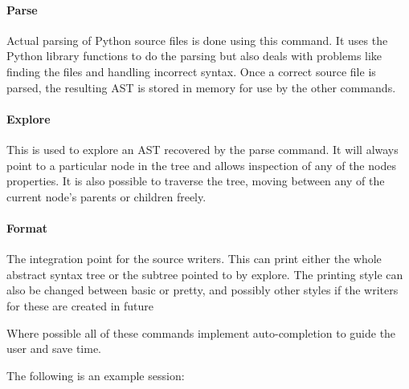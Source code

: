\documentclass{report}
\begin{document}
\paragraph{Parse}

Actual parsing of Python source files is done using this command. It uses the Python library functions to do the parsing but also
deals with problems like finding the files and handling incorrect syntax. Once a correct source file is parsed, the resulting AST
is stored in memory for use by the other commands.

\paragraph{Explore}

This is used to explore an AST recovered by the parse command. It will always point to a particular node in the tree and allows
inspection of any of the nodes properties. It is also possible to traverse the tree, moving between any of the current node's parents or
children freely.

\paragraph{Format}

The integration point for the source writers. This can print either the whole abstract syntax tree or the subtree pointed to by
explore. The printing style can also be changed between basic or pretty, and possibly other styles if the writers for these are created in future

Where possible all of these commands implement auto-completion to guide the user and save time.

The following is an example session:
\end{document}
